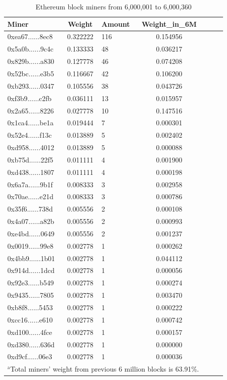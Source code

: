 \documentclass[conference]{IEEEtran}
\begin{document}
\begin{table}[htbp]
\caption{Ethereum block miners from 6,000,001 to 6,000,360}
\begin{center}
\begin{tabular}{lclclcl}
\hline
Miner                                      & Weight   & Amount & Weight\_in\_6M \\
\hline
0xea67......8ec8 & 0.322222 & 116    & 0.154956   \\
0x5a0b......9c4c & 0.133333 & 48     & 0.036217   \\
0x829b......a830 & 0.127778 & 46     & 0.074208   \\
0x52bc......e3b5 & 0.116667 & 42     & 0.106200   \\
0xb293......0347 & 0.105556 & 38     & 0.043726   \\
0xf3b9......c2fb & 0.036111 & 13     & 0.015957  \\
0x2a65......8226 & 0.027778 & 10     & 0.147516   \\
0x1ca4......be1a & 0.019444 & 7      & 0.000301   \\
0x52e4......f13c & 0.013889 & 5      & 0.002402   \\
0xd958......4012 & 0.013889 & 5      & 0.000088   \\
0xb75d......22f5 & 0.011111 & 4      & 0.001900   \\
0xd438......1807 & 0.011111 & 4      & 0.000198   \\
0x6a7a......9b1f & 0.008333 & 3      & 0.002958   \\
0x70ae......e21d & 0.008333 & 3      & 0.000786   \\
0x35f6......738d & 0.005556 & 2      & 0.000108   \\
0x4a07......a82b & 0.005556 & 2      & 0.000993   \\
0xe4bd......0649 & 0.005556 & 2      & 0.001237   \\
0x0019......99e8 & 0.002778 & 1      & 0.000262   \\
0x4bb9......1b01 & 0.002778 & 1      & 0.044112   \\
0x914d......1dcd & 0.002778 & 1      & 0.000056   \\
0x92e3......b549 & 0.002778 & 1      & 0.000274   \\
0x9435......7805 & 0.002778 & 1      & 0.003470   \\
0xb8f8......5453 & 0.002778 & 1      & 0.000222   \\
0xcc16......e610 & 0.002778 & 1      & 0.000742   \\
0xd100......4fce & 0.002778 & 1      & 0.000157   \\
0xd380......636d & 0.002778 & 1      & 0.000000   \\
0xd9cf......06e3 & 0.002778 & 1      & 0.000036   \\
\hline
\multicolumn{4}{l}{$^{\mathrm{a}}$Total miners' weight from previous 6 million blocks is 63.91\%.}
\end{tabular}
\end{center}
\end{table}
\end{document}

